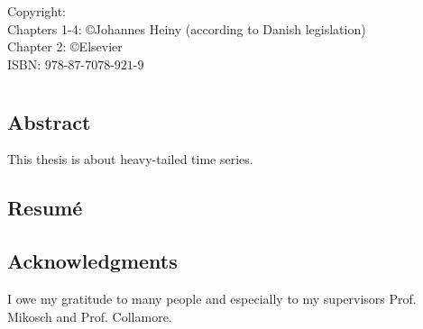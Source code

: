 \vspace*{5cm}
\noindent \hspace*{0.5cm} Copyright:\\
\hspace*{0.5cm} Chapters 1-4: \copyright Johannes Heiny (according to Danish legislation)\\
\hspace*{0.5cm} Chapter 2: \copyright Elsevier\\

\noindent \hspace*{0.5cm} ISBN: $978$-$87$-$7078$-$921$-$9$

\begin{comment}
{	\pagestyle{empty}
	\setlength{\topmargin}{0pt}
	\setlength{\headheight}{0pt}
	\setlength{\headsep}{0pt}
	\setlength{\footskip}{0pt}
	
	\setlength{\parskip}{12pt}	
	
 \large \textbf{\textsc{Johannes Heiny}}
		
		\vspace*{1cm}
		
	
	\vspace*{\fill}}
\end{comment}


\chapter*{}
\vspace*{-2cm}
\section*{Abstract}

This thesis is about heavy-tailed time series.


\section*{Resum{\'e}}

\newpage
\section*{Acknowledgments}

I owe my gratitude to many people and especially to my supervisors Prof. Mikosch and Prof. Collamore.
\bigskip


